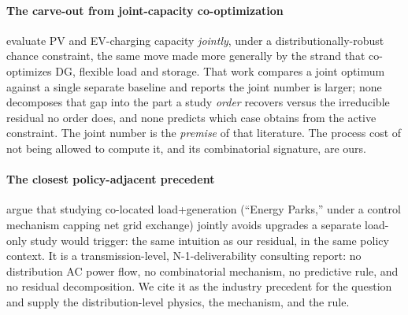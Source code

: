 \documentclass[review,authoryear,12pt]{elsarticle}
\begin{document}
\paragraph{The carve-out from joint-capacity co-optimization}
\citet{chen2017} evaluate PV and EV-charging capacity \emph{jointly}, under a
distributionally-robust chance constraint, the same move made more
generally by the strand that co-optimizes DG, flexible load and storage. That
work compares a joint optimum against a single separate baseline and reports
the joint number is larger; none decomposes that gap into the part a study
\emph{order} recovers versus the irreducible residual no order does, and none
predicts which case obtains from the active constraint. The joint number is
the \emph{premise} of that literature. The process cost of not being allowed
to compute it, and its combinatorial signature, are ours.

\paragraph{The closest policy-adjacent precedent}
\citet{brattle2025} argue that studying co-located load+generation
(``Energy Parks,'' under a control mechanism capping net grid exchange)
jointly avoids upgrades a separate load-only study would trigger: the same
intuition as our residual, in the same policy context. It is a
transmission-level, N-1-deliverability consulting report: no distribution AC
power flow, no combinatorial mechanism, no predictive rule, and no residual
decomposition. We cite it as the industry precedent for the question and
supply the distribution-level physics, the mechanism, and the rule.
\end{document}
